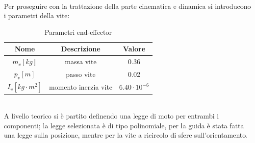 \\Per proseguire con la trattazione della parte cinematica e dinamica si introducono i parametri della vite:
\begin{table}[h!]
\centering
\begin{tabular}{|c |c |c|} 
 \hline
 Nome & Descrizione  & Valore \\ [0.5ex] 
 \hline\hline
 $m_v [kg]$ & massa vite  & 0.36 \\ 
 $p_v [m]$ & passo vite & 0.02 \\
 $I_v [kg\cdot m^2]$ & momento inerzia vite  & $6.40\cdot 10^{-6}$ \\
 \hline
\end{tabular}
\caption{Parametri end-effector}
\label{table:2}
\end{table}
\\A livello teorico si è partito definendo una legge di moto per entrambi i componenti; la legge selezionata è di tipo polinomiale, per la guida è stata fatta una legge sulla posizione, mentre per la vite a ricircolo di sfere sull'orientamento.

